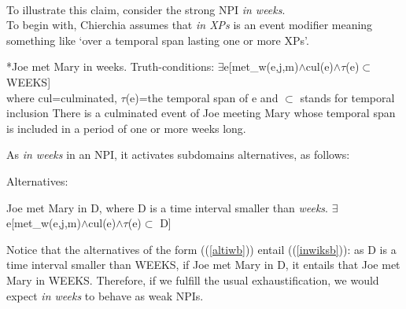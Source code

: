 \documentclass[a4paper,11pt]{article}
\newcommand{\reff}[1]{(\ref{#1})}
\begin{document}
\paragraph{}
To illustrate this claim, consider the strong NPI \textit{in weeks}.
\\To begin with, Chierchia assumes that \textit{in XPs} is an event modifier meaning something like `over a temporal span lasting one or more XPs'.
\begin{exe}
\ex\label{inwiks} \begin{xlist}
\ex\label{inwiksa} *Joe met Mary in weeks.
\ex\label{inwiksb} Truth-conditions: $\exists$e[met_w(e,j,m)$\wedge$cul(e)$\wedge\tau$(e)$\subset$ WEEKS] 
\\where cul=culminated, $\tau$(e)=the temporal span of e and $\subset$ stands for temporal inclusion
\ex\label{inwiksc} There is a culminated event of Joe meeting Mary whose temporal span is included in a period of one or more weeks long.
\end{xlist}
\end{exe}
As \textit{in weeks} in an NPI, it activates subdomains alternatives, as follows:
\begin{exe}
\ex\label{altiw} Alternatives: \begin{xlist}
\ex\label{altiwa} Joe met Mary in D, where D is a time interval smaller than \textit{weeks}.
\ex\label{altiwb} $\exists$e[met_w(e,j,m)$\wedge$cul(e)$\wedge\tau$(e)$\subset$ D]
\end{xlist}
\end{exe}
Notice that the alternatives of the form (\reff{altiwb}) entail (\reff{inwiksb}): as D is a time interval smaller than WEEKS, if Joe met Mary in D, it entails that Joe met Mary in WEEKS. Therefore, if we fulfill the usual exhaustification, we would expect \textit{in weeks} to behave as weak NPIs.
\end{document}
